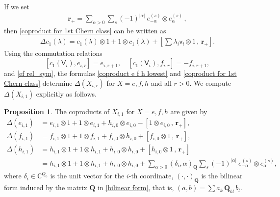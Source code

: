 \documentclass[10pt]{amsart}
\theoremstyle{definition}
\newtheorem{Proposition}[Theorem]{Proposition}
\numberwithin{equation}{section}
\newcommand{\bC}{\mathbb{C}}
\begin{document}
If we set
\begin{align*}
    \pmb r_+=\sum_{\alpha>0}\sum_s (-1)^{|\alpha|}\: e_{-\alpha}^{(s)}\otimes e_{\alpha}^{(s)}\,,
\end{align*}
then \eqref{coproduct for 1st Chern class} can be written as
\begin{align*}
\Delta c_1(\lambda)=c_1(\lambda)\otimes 1+1\otimes c_1(\lambda)+\left[\sum\lambda_i\mathsf v_i\otimes 1\,,\,\pmb r_+\right].
\end{align*}
Using the commutation relations $$[c_1(\mathsf V_i),e_{i,r}]=e_{i,r+1}, \quad [c_1(\mathsf V_i),f_{i,r}]=-f_{i,r+1},$$ 
and \eqref{ef rel_sym}, the formulas \eqref{coproduct e f h lowest} and \eqref{coproduct for 1st Chern class} determine $\Delta(X_{i,r})$ for $X=e,f,h$ and all $r>0$. We compute $\Delta(X_{i,1})$ explicitly as follows.
\begin{Proposition}
The coproducts of $X_{i,1}$ for $X=e,f,h$ are given by
\begin{equation}\label{coproduct e f h 1st nontrivial}
\begin{split}
\Delta(e_{i,1})&=e_{i,1}\otimes 1+1\otimes e_{i,1}+h_{i,0}\otimes e_{i,0}-\left[1\otimes e_{i,0}\,,\,\pmb r_+\right],\\
\Delta(f_{i,1})&=f_{i,1}\otimes 1+1\otimes f_{i,1}+f_{i,0}\otimes h_{i,0}+[f_{i,0}\otimes 1\,,\, \pmb r_+],\\
\Delta(h_{i,1})&=h_{i,1}\otimes 1+1\otimes h_{i,1}+h_{i,0}\otimes h_{i,0}+[h_{i,0}\otimes 1\,,\, \pmb r_+]\\
&=h_{i,1}\otimes 1+1\otimes h_{i,1}+h_{i,0}\otimes h_{i,0}+\sum_{\alpha>0}(\delta_i,\alpha)_{\pmb Q}\sum_s (-1)^{|\alpha|}\: e_{-\alpha}^{(s)}\otimes e_{\alpha}^{(s)},
\end{split}
\end{equation}
where $\delta_i\in \bC^{Q_0}$ is the unit vector for the $i$-th coordinate, $(\cdot,\cdot)_{\pmb Q}$ is the bilinear form induced by the matrix $\pmb Q$ in \eqref{bilinear form}, that is, $(a,b)=\sum a_k\,\pmb Q_{kl}\,b_l$.
\end{Proposition}
\end{document}
